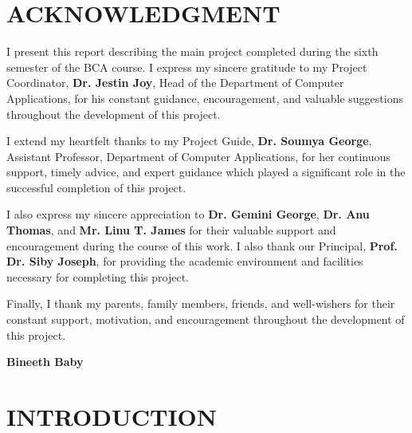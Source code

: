 \documentclass{sgcproject}
\begin{document}
\chapter*{ACKNOWLEDGMENT}

I present this report describing the main project completed during the sixth semester of the BCA course. I express my sincere gratitude to my Project Coordinator, \textbf{Dr. Jestin Joy}, Head of the Department of Computer Applications, for his constant guidance, encouragement, and valuable suggestions throughout the development of this project.

I extend my heartfelt thanks to my Project Guide, \textbf{Dr. Soumya George}, Assistant Professor, Department of Computer Applications, for her continuous support, timely advice, and expert guidance which played a significant role in the successful completion of this project.

I also express my sincere appreciation to \textbf{Dr. Gemini George}, \textbf{Dr. Anu Thomas}, and \textbf{Mr. Linu T. James} for their valuable support and encouragement during the course of this work. I also thank our Principal, \textbf{Prof. Dr. Siby Joseph}, for providing the academic environment and facilities necessary for completing this project.

Finally, I thank my parents, family members, friends, and well-wishers for their constant support, motivation, and encouragement throughout the development of this project.

\begin{flushright}
\textbf{Bineeth Baby}
\end{flushright}

\newpage
\restoregeometry
\tableofcontents
\newpage

\cleardoublepage
{}
\listoffigures
\newpage

\cleardoublepage
{}
\listoftables
\newpage

\pagestyle{plain}

\chapter{INTRODUCTION}
\setcounter{page}{1}
\renewcommand{\baselinestretch}{1.50}
\end{document}
